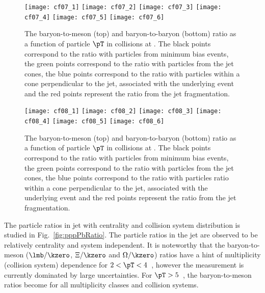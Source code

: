 \documentclass[ALICE,manyauthors]{cernphprep}
\begin{document}
\begin{figure}[!ht]
	\begin{center}
		\texttt{[image: cf07\_1]}
		\texttt{[image: cf07\_2]}
		\texttt{[image: cf07\_3]}
		\texttt{[image: cf07\_4]}
		\texttt{[image: cf07\_5]}
		\texttt{[image: cf07\_6]}
	\end{center}
	\caption{The baryon-to-meson (top) and baryon-to-baryon (bottom) ratio as a function of particle $\pT$ in \pp collisions at \thirteen. The black points correspond to the ratio with particles from minimum bias events, the green points correspond to the ratio with particles from the jet cones, the blue points correspond to the ratio with particles within a cone perpendicular to the jet, associated with the underlying event and the red points represent the ratio from the jet fragmentation.}
	\label{fig:ppRatio}
\end{figure}
\begin{figure}[!ht]
	\begin{center}
		\texttt{[image: cf08\_1]}
		\texttt{[image: cf08\_2]}
		\texttt{[image: cf08\_3]}
		\texttt{[image: cf08\_4]}
		\texttt{[image: cf08\_5]}
		\texttt{[image: cf08\_6]}
	\end{center}
	\caption{The baryon-to-meson (top) and baryon-to-baryon (bottom) ratio as a function of particle $\pT$ in \pPb collisions at \fivenn. The black points correspond to the ratio with particles from minimum bias events, the green points correspond to the ratio with particles from the jet cones, the blue points correspond to the ratio with particles ratio within a cone perpendicular to the jet, associated with the underlying event and the red points represent the ratio from the jet fragmentation.}
	\label{fig:pPbRatio}
\end{figure}

The particle ratios in jet with centrality and collision system distribution is studied in Fig.~\ref{fig:pppPbRatio}.
The particle ratios in the jet are observed to be relatively centrality and system independent.
It is noteworthy that the baryon-to-meson ($\lmb/\kzero$, $\Xi/\kzero$ and $\Omega/\kzero$) ratios have a hint of multiplicity (collision system) dependence for $2 < \pT < 4$~\GeVc, however the measurement is currently dominated by large uncertainties.
For $\pT > 5$~\GeVc, the baryon-to-meson ratios become  for all multiplicity classes and collision systems. 
\end{document}
